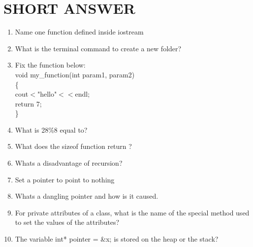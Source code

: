 \documentclass[a4paper]{article}
\begin{document}
\section{SHORT ANSWER}
\begin{enumerate}
    \item Name one function defined inside iostream
    \item What is the terminal command to create a new folder?
    \item Fix the function below: \\
          void my\_function(int param1, param2)\\
          \{\\
          \text{    }cout$<$"hello"$<<$endl;\\
          \text{    }return 7;\\
          \}\\
    \item What is 28\%8 equal to?
    \item What does the sizeof function return ?
    \item Whats a disadvantage of recursion?
    \item Set a pointer to point to nothing
    \item Whats a dangling pointer and how is it caused.
    \item For private attributes of a class, what is the name of the special method used
          to set the values of the attributes?
    \item The variable int* pointer = \&x; is stored on the heap or the stack?
\end{enumerate}
\newpage 
\end{document}
